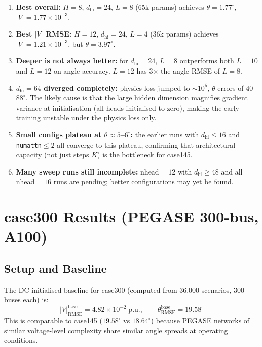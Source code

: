 \documentclass{article}
\begin{document}
\begin{enumerate}[noitemsep]
  \item \textbf{Best overall:} $H{=}8$, $d_{\mathrm{hi}}{=}24$, $L{=}8$
    (65k params) achieves $\theta = 1.77^\circ$, $|V| = 1.77\times10^{-3}$.
  \item \textbf{Best $|V|$ RMSE:} $H{=}12$, $d_{\mathrm{hi}}{=}24$, $L{=}4$
    (36k params) achieves $|V| = 1.21\times10^{-3}$, but $\theta = 3.97^\circ$.
  \item \textbf{Deeper is not always better:} for $d_{\mathrm{hi}}=24$,
    $L{=}8$ outperforms both $L{=}10$ and $L{=}12$ on angle accuracy.
    $L{=}12$ has 3$\times$ the angle RMSE of $L{=}8$.
  \item \textbf{$d_{\mathrm{hi}}=64$ diverged completely:} physics loss jumped
    to $\sim10^5$, $\theta$ errors of $40$--$88^\circ$.  The likely cause
    is that the large hidden dimension magnifies gradient variance at
    initialisation (all heads initialised to zero), making the early
    training unstable under the physics loss only.
  \item \textbf{Small configs plateau at $\theta \approx 5$--$6^\circ$:}
    the earlier runs with $d_{\mathrm{hi}} \le 16$ and \texttt{numattn}$\le2$
    all converge to this plateau, confirming that architectural capacity
    (not just steps $K$) is the bottleneck for case145.
  \item \textbf{Many sweep runs still incomplete:} nhead$=12$ with
    $d_{\mathrm{hi}}\ge48$ and all nhead$=16$ runs are pending; better
    configurations may yet be found.
\end{enumerate}

\section{case300 Results (PEGASE 300-bus, A100)}

\subsection{Setup and Baseline}

The DC-initialised baseline for case300 (computed from 36,000 scenarios,
300 buses each) is:
\[
  |V|_{\mathrm{RMSE}}^{\mathrm{base}} = 4.82\times10^{-2}\;\text{p.u.},
  \qquad
  \theta_{\mathrm{RMSE}}^{\mathrm{base}} = 19.58^\circ
\]
This is comparable to case145 ($19.58^\circ$ vs $18.64^\circ$) because
PEGASE networks of similar voltage-level complexity share similar angle
spreads at operating conditions.
\end{document}
